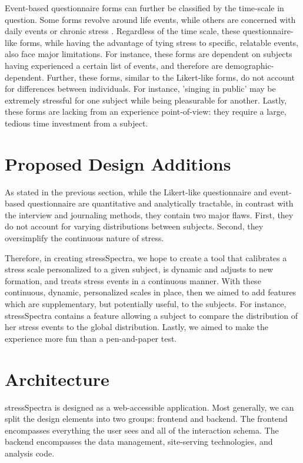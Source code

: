 \documentclass{sigchi}
\begin{document}
Event-based questionnaire forms can further be classified by the time-scale in question. Some forms revolve around life events, while others are concerned with daily events or chronic stress \cite{macarthurResearch}. Regardless of the time scale, these questionnaire-like forms, while having the advantage of tying stress to specific, relatable events, also face major limitations. For instance, these forms are dependent on subjects having experienced a certain list of events, and therefore are demographic-dependent. Further, these forms, similar to the Likert-like forms, do not account for differences between individuals. For instance, 'singing in public' may be extremely stressful for one subject while being pleasurable for another. Lastly, these forms are lacking from an experience point-of-view: they require a large, tedious time investment from a subject.


\section{Proposed Design Additions}
As stated in the previous section, while the Likert-like questionnaire and event-based questionnaire are quantitative and analytically tractable, in contrast with the interview and journaling methods, they contain two major flaws. First, they do not account for varying distributions between subjects. Second, they oversimplify the continuous nature of stress.

Therefore, in creating stressSpectra, we hope to create a tool that calibrates a stress scale personalized to a given subject, is dynamic and adjusts to new formation, and treats stress events in a continuous manner.
With these continuous, dynamic, personalized scales in place, then we aimed to add features which are supplementary, but potentially useful, to the subjects. For instance, stressSpectra contains a feature allowing a subject to compare the distribution of her stress events to the global distribution. Lastly, we aimed to make the experience more fun than a pen-and-paper test.

\section{Architecture}
stressSpectra is designed as a web-accessible application. Most generally, we can split the design elements into two groups: frontend and backend. The frontend encompasses everything the user sees and all of the interaction schema. The backend encompasses the data management, site-serving technologies, and analysis code. 
\end{document}
